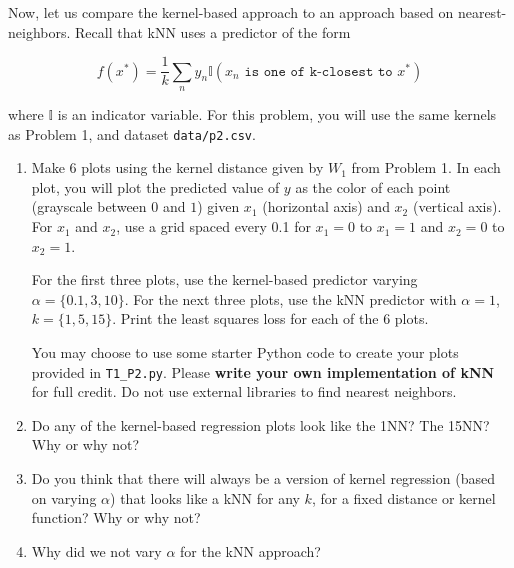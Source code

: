 \documentclass[submit]{harvardml}
\begin{document}
\begin{problem}

Now, let us compare the kernel-based approach to an approach based on
nearest-neighbors.  Recall that kNN uses a predictor of the form

  \begin{equation*}
    f(x^*) = \frac{1}{k} \sum_n y_n \mathbb{I}(x_n \texttt{ is one of k-closest to } x^*)
  \end{equation*}

 where $\mathbb{I}$ is an indicator variable. For this problem, you will use the same kernels as Problem 1, and dataset \verb|data/p2.csv|.

\begin{enumerate}

\item Make 6 plots using the kernel distance given by $W_1$ from Problem 1.  In each plot,
  you will plot the predicted value of $y$ as the color of each point (grayscale between $0$ and $1$) given $x_1$
  (horizontal axis) and $x_2$ (vertical axis).  For $x_1$ and $x_2$,
  use a grid spaced every 0.1 for $x_1=0$ to $x_1=1$ and $x_2=0$ to
  $x_2=1$.  
  
  For the first three plots, use the kernel-based predictor
  varying $\alpha = \{0.1,3,10\}$.  For the next three plots, use
  the kNN predictor with $\alpha = 1$, $k=\{1,5,15\}$.  Print the least squares loss for each of the 6 plots.
  
  You may choose to use some starter Python code to create your plots provided in \verb|T1_P2.py|.  Please \textbf{write your own implementation of kNN} for full credit.  Do not use external libraries to find nearest neighbors.
 
\item Do any of the kernel-based regression plots look like the 1NN?
  The 15NN?  Why or why not?

\item Do you think that there will always be a version of kernel
  regression (based on varying $\alpha$) that looks like a kNN for any
  $k$, for a fixed distance or kernel function?  Why or why not?
\item Why did we not vary $\alpha$ for the kNN approach?  

\end{enumerate}

\end{problem}
\end{document}
